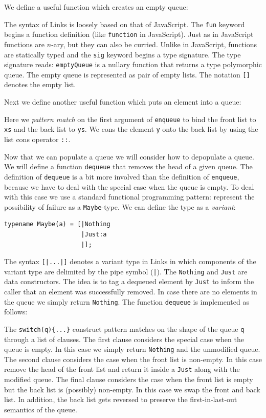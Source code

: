 \documentclass[12pt,mscres,cdtppar,twoside,openright,logo,rightchapter,normalheadings]{infthesis}
\newcommand{\snippet}[1]{}
\theoremstyle{definition}
\begin{document}
We define a useful function which creates an empty queue:
%
\snippet{emptyQueue.links}
%
The syntax of Links is loosely based on that of JavaScript. The
\lstinline$fun$ keyword begins a function definition (like
\lstinline$function$ in JavaScript). Just as in JavaScript functions
are $n$-ary, but they can also be curried.  Unlike in JavaScript,
functions are statically typed and the \lstinline$sig$ keyword begins
a type signature. The type signature reads: \lstinline$emptyQueue$ is
a nullary function that returns a type polymorphic queue. The empty
queue is represented as pair of empty lists. The notation
\lstinline$[]$ denotes the empty list.

Next we define another useful function which puts an element into a queue: 
%
\snippet{enqueue.links}
%
Here we \emph{pattern match} on the first argument of
\lstinline$enqueue$ to bind the front list to \lstinline$xs$ and the
back list to \lstinline$ys$. We cons the element \lstinline$y$ onto
the back list by using the list cons operator \lstinline$::$.

Now that we can populate a queue we will consider how to depopulate a
queue. We will define a function \lstinline$dequeue$ that removes the
head of a given queue. The definition of \lstinline$dequeue$ is a bit
more involved than the definition of \lstinline$enqueue$, because we
have to deal with the special case when the queue is empty. To deal
with this case we use a standard functional programming pattern:
represent the possibility of failure as a \lstinline$Maybe$-type. We
can define the type as a \emph{variant}:
%
\begin{lstlisting}
typename Maybe(a) = [|Nothing
                     |Just:a
                     |];
\end{lstlisting}
%
The syntax \lstinline$[|...|]$ denotes a variant type in Links in
which components of the variant type are delimited by the pipe symbol
(\lstinline$|$). The \lstinline$Nothing$ and \lstinline$Just$ are data
constructors. The idea is to tag a dequeued element by
\lstinline$Just$ to inform the caller that an element was successfully
removed. In case there are no elements in the queue we simply return
\lstinline$Nothing$. The function \lstinline$dequeue$ is implemented
as follows:
%
\snippet{dequeue.links}
%
The \lstinline$switch(q){...}$ construct pattern matches on the shape
of the queue \lstinline$q$ through a list of clauses. The first clause
considers the special case when the queue is empty. In this case we
simply return \lstinline$Nothing$ and the unmodified queue. The second
clause considers the case when the front list is non-empty. In this
case remove the head of the front list and return it inside a
\lstinline$Just$ along with the modified queue. The final clause
considers the case when the front list is empty but the back list is
(possibly) non-empty. In this case we swap the front and back list. In
addition, the back list gets reversed to preserve the
first-in-last-out semantics of the queue.
\end{document}
